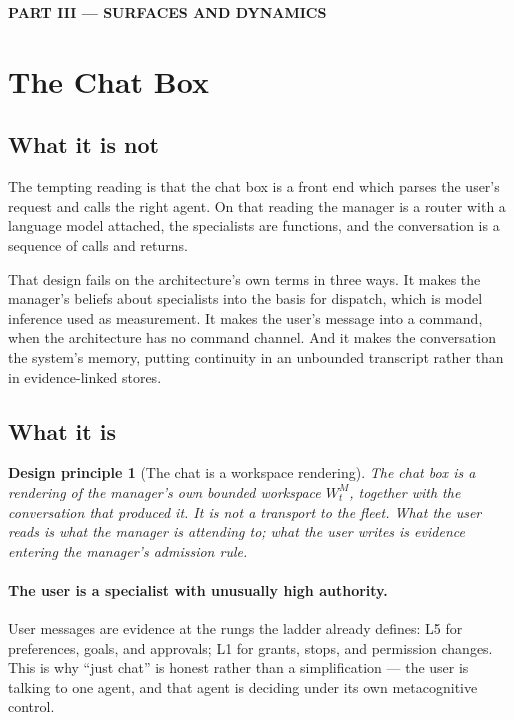\documentclass[11pt]{article}
\newtheorem{principle}{Design principle}
\begin{document}
\newpage
\begin{center}\large\bfseries PART III --- SURFACES AND DYNAMICS\end{center}

\section{The Chat Box}
\label{sec:chat}

\subsection{What it is not}

The tempting reading is that the chat box is a front end which parses the user's request and calls the right agent. On that reading the manager is a router with a language model attached, the specialists are functions, and the conversation is a sequence of calls and returns.

That design fails on the architecture's own terms in three ways. It makes the manager's beliefs about specialists into the basis for dispatch, which is model inference used as measurement. It makes the user's message into a command, when the architecture has no command channel. And it makes the conversation the system's memory, putting continuity in an unbounded transcript rather than in evidence-linked stores.

\subsection{What it is}

\begin{principle}[The chat is a workspace rendering]
\label{prin:chatis}
The chat box is a rendering of the manager's own bounded workspace $W^{M}_t$, together with the conversation that produced it. It is not a transport to the fleet. What the user reads is what the manager is attending to; what the user writes is evidence entering the manager's admission rule.
\end{principle}

\paragraph{The user is a specialist with unusually high authority.} User messages are evidence at the rungs the ladder already defines: L5 for preferences, goals, and approvals; L1 for grants, stops, and permission changes. This is why ``just chat'' is honest rather than a simplification --- the user is talking to one agent, and that agent is deciding under its own metacognitive control.
\end{document}
